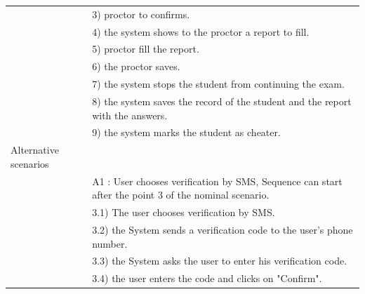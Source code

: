 \documentclass[]{uc2pfecaneva}
\begin{document}
\begin{table}[h]
\begin{tabularx}{\textwidth}{|l|X|}
		                      & 3) proctor to confirms.                                                                                                \\
		                      & 4) the system shows to the proctor a report to fill.                                                                   \\
		                      & 5) proctor fill the report.                                                                                            \\
		                      & 6) the proctor saves.                                                                                                  \\
		                      & 7) the system stops the student from continuing the exam.                                                              \\
		                      & 8) the system saves the record of the student and the report with the answers.                                         \\
		                      & 9) the system marks the student as cheater.                                                                            \\ \hline
		Alternative scenarios &                                                                                                                        \\
		                      & A1 : User chooses verification by SMS,  Sequence can start after the point 3 of the nominal scenario.                  \\
		                      & \hspace{4mm}3.1) The user chooses verification by SMS.                                                                 \\
		                      & \hspace{4mm}3.2) the System sends a verification code to the user's phone number.                                      \\
		                      & \hspace{4mm}3.3) the System asks the user to enter his verification code.                                              \\
		                      & \hspace{4mm}3.4) the user enters the code and clicks on "Confirm".                                                     \\

\end{tabularx}
\end{table}
\end{document}
